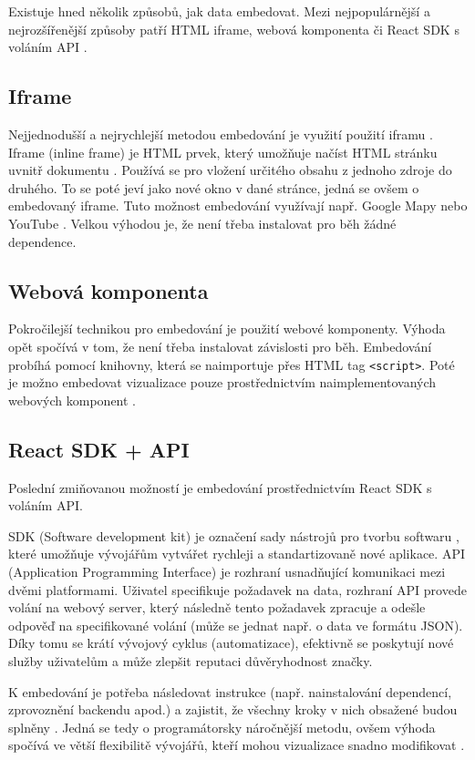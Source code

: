 \documentclass[czech, bc, kiv, he, iso690numb]{fasthesis}
\begin{document}
Existuje hned několik způsobů, jak data embedovat. Mezi nejpopulárnější a nejrozšířenější způsoby patří HTML iframe, webová komponenta či React SDK s voláním API \cite{goodDataEmbedded}. 

\subsection{Iframe}
Nejjednodušší a nejrychlejší metodou embedování je využití použití iframu \cite{goodDataEmbedded}. Iframe (inline frame) je HTML prvek, který umožňuje načíst HTML stránku uvnitř dokumentu \cite{iFrameAdv}. Používá se pro vložení určitého obsahu z jednoho zdroje do druhého. To se poté jeví jako nové okno v dané stránce, jedná se ovšem o embedovaný iframe. Tuto možnost embedování využívají např. Google Mapy nebo YouTube \cite{iFrameAdv}. Velkou výhodou je, že není třeba instalovat pro běh žádné dependence.

\subsection{Webová komponenta}
Pokročilejší technikou pro embedování je použití webové komponenty. Výhoda opět spočívá v tom, že není třeba instalovat závislosti pro běh. Embedování probíhá pomocí knihovny, která se naimportuje přes HTML tag \texttt{<script>}. Poté je možno embedovat vizualizace pouze prostřednictvím naimplementovaných webových komponent \cite{webComp}.

\subsection{React SDK + API}
Poslední zmiňovanou možností je embedování prostřednictvím React SDK s voláním API. 

SDK (Software development kit) je označení sady nástrojů pro tvorbu softwaru \cite{SDKvsAPI}, které umožňuje vývojářům vytvářet rychleji a standartizovaně nové aplikace. API 
(Application Programming Interface) je rozhraní usnadňující komunikaci mezi dvěmi platformami. Uživatel specifikuje požadavek na data, rozhraní API provede volání na webový server, který
následně tento požadavek zpracuje a odešle odpověď na specifikované volání (může se jednat např. o data ve formátu JSON). Díky tomu se krátí vývojový cyklus (automatizace), efektivně 
se poskytují nové služby uživatelům a může zlepšit reputaci důvěryhodnost značky.

K embedování je potřeba následovat instrukce (např. nainstalování dependencí, zprovoznění backendu apod.) a zajistit, že všechny kroky v nich obsažené budou splněny \cite{reactSDKComp}. Jedná se tedy o programátorsky náročnější metodu, ovšem výhoda spočívá ve větší flexibilitě vývojářů, kteří mohou vizualizace snadno modifikovat \cite{goodDataEmbedded}.
\end{document}
